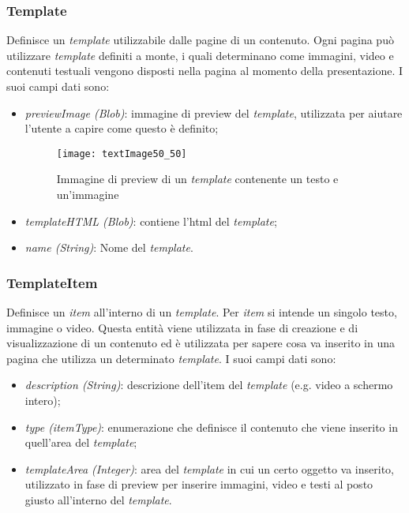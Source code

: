 \subsubsection{Template}
Definisce un \textit{template} utilizzabile dalle pagine di un contenuto. Ogni pagina può utilizzare \textit{template} definiti a monte, i quali determinano come immagini, video e contenuti testuali vengono disposti nella pagina al momento della presentazione. I suoi campi dati sono:
\begin{itemize}
    \item \textit{previewImage (Blob)}: immagine di preview del \textit{template}, utilizzata per aiutare l'utente a capire come questo è definito;
    \begin{figure}[h]
        \begin{center}
        \texttt{[image: textImage50\_50]}
        \caption{Immagine di preview di un \textit{template} contenente un testo e un'immagine}
        \label{fig:figure15}
        \end{center}
    \end{figure}
    \item \textit{templateHTML (Blob)}: contiene l'html del \textit{template};
    \item \textit{name (String)}: Nome del \textit{template}.
\end{itemize}

\subsubsection{TemplateItem}
Definisce un \textit{item} all'interno di un \textit{template}. Per \textit{item} si intende un singolo testo, immagine o video. Questa entità viene utilizzata in fase di creazione e di visualizzazione di un contenuto ed è utilizzata per sapere cosa va inserito in una pagina che utilizza un determinato \textit{template}. 
I suoi campi dati sono:
\begin{itemize}
    \item \textit{description (String)}: descrizione dell'item del \textit{template} (e.g. video a schermo intero);
    \item \textit{type (itemType)}: enumerazione che definisce il contenuto che viene inserito in quell’area del \textit{template};
    \item \textit{templateArea (Integer)}: area del \textit{template} in cui un certo oggetto va inserito, utilizzato in fase di preview per inserire immagini, video e testi al posto giusto all'interno del \textit{template}.
\end{itemize}

